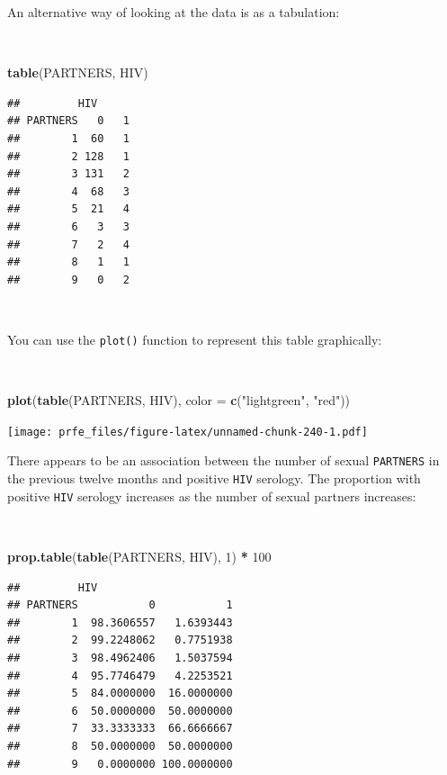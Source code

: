\documentclass[12pt,a4paper]{book}
\newenvironment{Shaded}{\begin{snugshade}}{\end{snugshade}}
\newcommand{\DataTypeTok}[1]{\textcolor[rgb]{0.13,0.29,0.53}{#1}}
\newcommand{\DecValTok}[1]{\textcolor[rgb]{0.00,0.00,0.81}{#1}}
\newcommand{\KeywordTok}[1]{\textcolor[rgb]{0.13,0.29,0.53}{\textbf{#1}}}
\newcommand{\NormalTok}[1]{#1}
\newcommand{\OperatorTok}[1]{\textcolor[rgb]{0.81,0.36,0.00}{\textbf{#1}}}
\newcommand{\StringTok}[1]{\textcolor[rgb]{0.31,0.60,0.02}{#1}}
\theoremstyle{definition}
\theoremstyle{definition}
\theoremstyle{definition}
\theoremstyle{remark}
\begin{document}
\newpage

An alternative way of looking at the data is as a tabulation:

~

\begin{Shaded}
\begin{Highlighting}[]
\KeywordTok{table}\NormalTok{(PARTNERS, HIV)}
\end{Highlighting}
\end{Shaded}

\begin{verbatim}
##         HIV
## PARTNERS   0   1
##        1  60   1
##        2 128   1
##        3 131   2
##        4  68   3
##        5  21   4
##        6   3   3
##        7   2   4
##        8   1   1
##        9   0   2
\end{verbatim}

~

You can use the \texttt{plot()} function to represent this table
graphically:

~

\begin{Shaded}
\begin{Highlighting}[]
\KeywordTok{plot}\NormalTok{(}\KeywordTok{table}\NormalTok{(PARTNERS, HIV), }\DataTypeTok{color =} \KeywordTok{c}\NormalTok{(}\StringTok{"lightgreen"}\NormalTok{, }\StringTok{"red"}\NormalTok{))}
\end{Highlighting}
\end{Shaded}

\texttt{[image: prfe\_files/figure-latex/unnamed-chunk-240-1.pdf]}

\newpage

There appears to be an association between the number of sexual
\texttt{PARTNERS} in the previous twelve months and positive
\texttt{HIV} serology. The proportion with positive \texttt{HIV}
serology increases as the number of sexual partners increases:

~

\begin{Shaded}
\begin{Highlighting}[]
\KeywordTok{prop.table}\NormalTok{(}\KeywordTok{table}\NormalTok{(PARTNERS, HIV), }\DecValTok{1}\NormalTok{) }\OperatorTok{*}\StringTok{ }\DecValTok{100}
\end{Highlighting}
\end{Shaded}

\begin{verbatim}
##         HIV
## PARTNERS           0           1
##        1  98.3606557   1.6393443
##        2  99.2248062   0.7751938
##        3  98.4962406   1.5037594
##        4  95.7746479   4.2253521
##        5  84.0000000  16.0000000
##        6  50.0000000  50.0000000
##        7  33.3333333  66.6666667
##        8  50.0000000  50.0000000
##        9   0.0000000 100.0000000
\end{verbatim}
\end{document}
